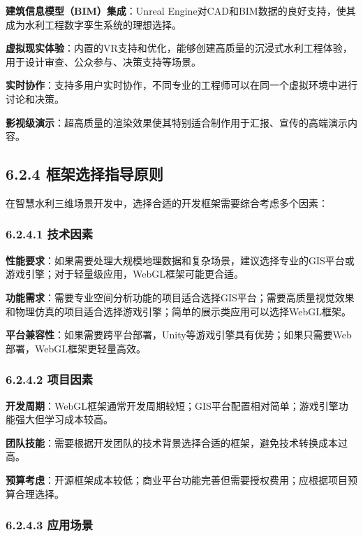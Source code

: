 \textbf{建筑信息模型（BIM）集成}：Unreal
Engine对CAD和BIM数据的良好支持，使其成为水利工程数字孪生系统的理想选择。

\textbf{虚拟现实体验}：内置的VR支持和优化，能够创建高质量的沉浸式水利工程体验，用于设计审查、公众参与、决策支持等场景。

\textbf{实时协作}：支持多用户实时协作，不同专业的工程师可以在同一个虚拟环境中进行讨论和决策。

\textbf{影视级演示}：超高质量的渲染效果使其特别适合制作用于汇报、宣传的高端演示内容。

\subsection{6.2.4
框架选择指导原则}\label{ux6846ux67b6ux9009ux62e9ux6307ux5bfcux539fux5219}

在智慧水利三维场景开发中，选择合适的开发框架需要综合考虑多个因素：

\subsubsection{6.2.4.1 技术因素}\label{ux6280ux672fux56e0ux7d20}

\textbf{性能要求}：如果需要处理大规模地理数据和复杂场景，建议选择专业的GIS平台或游戏引擎；对于轻量级应用，WebGL框架可能更合适。

\textbf{功能需求}：需要专业空间分析功能的项目适合选择GIS平台；需要高质量视觉效果和物理仿真的项目适合选择游戏引擎；简单的展示类应用可以选择WebGL框架。

\textbf{平台兼容性}：如果需要跨平台部署，Unity等游戏引擎具有优势；如果只需要Web部署，WebGL框架更轻量高效。

\subsubsection{6.2.4.2 项目因素}\label{ux9879ux76eeux56e0ux7d20}

\textbf{开发周期}：WebGL框架通常开发周期较短；GIS平台配置相对简单；游戏引擎功能强大但学习成本较高。

\textbf{团队技能}：需要根据开发团队的技术背景选择合适的框架，避免技术转换成本过高。

\textbf{预算考虑}：开源框架成本较低；商业平台功能完善但需要授权费用；应根据项目预算合理选择。

\subsubsection{6.2.4.3 应用场景}\label{ux5e94ux7528ux573aux666f}

